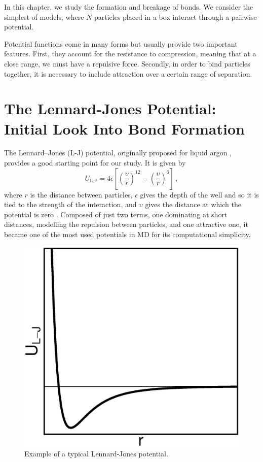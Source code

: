 \documentclass[../../main.tex]{subfiles}
\begin{document}
%
    In this chapter, we study the formation and breakage of bonds. We consider the simplest of models, where $N$ particles placed in a box interact through a pairwise potential.
    
    Potential functions come in many forms but usually provide two important features. First, they account for the resistance to compression, meaning that at a close range, we must have a repulsive force. Secondly, in order to bind particles together, it is necessary to include attraction over a certain range of separation.
    
\section{The Lennard-Jones Potential: Initial Look Into Bond Formation}

    The Lennard–Jones (L-J) potential, originally proposed for liquid argon \cite{jonesDeterminationMolecularFields1924}, provides a good starting point for our study. It is given by 
        \begin{equation}\label{eq: L-J - Lennard-Jones Potential}
            U_{\text{L-J}} = 4\epsilon \left[\left(\frac{\upsilon}{r}\right)^{12} - \left(\frac{\upsilon}{r}\right)^6\right] \,,
        \end{equation}
    where $r$ is the distance between particles, $\epsilon$ gives the depth of the well and so it is tied to the strength of the interaction, and $\upsilon$ gives the distance at which the potential is zero \cite{allenComputerSimulationLiquids2017}. Composed of just two terms, one dominating at short distances, modelling the repulsion between particles, and one attractive one, it became one of the most used potentials in MD for its computational simplicity.

    \begin{figure}[h]
        \centering
        \includegraphics[scale = 0.4]{Figures/lj-pot.eps}
        \caption{Example of a typical Lennard-Jones potential.}
        \label{fig: L-J Potential}
    \end{figure}
    
\end{document}
